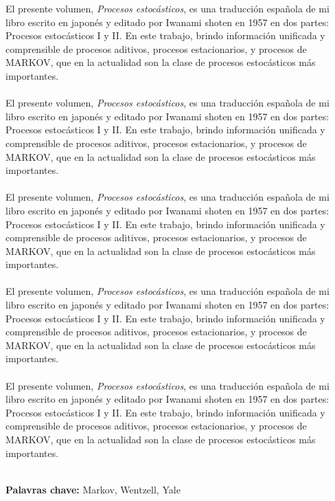 \noindent El presente volumen, \textit{Procesos estocásticos}, es una traducción española de mi libro escrito en japonés y editado por Iwanami shoten en 1957 en dos partes: Procesos estocásticos I y II. En este trabajo, brindo información unificada y comprensible de procesos aditivos, procesos estacionarios, y procesos de MARKOV, que en la actualidad son la clase de procesos estocásticos más importantes.\\\\ 
\noindent El presente volumen, \textit{Procesos estocásticos}, es una traducción española de mi libro escrito en japonés y editado por Iwanami shoten en 1957 en dos partes: Procesos estocásticos I y II. En este trabajo, brindo información unificada y comprensible de procesos aditivos, procesos estacionarios, y procesos de MARKOV, que en la actualidad son la clase de procesos estocásticos más importantes.\\\\ 
\noindent El presente volumen, \textit{Procesos estocásticos}, es una traducción española de mi libro escrito en japonés y editado por Iwanami shoten en 1957 en dos partes: Procesos estocásticos I y II. En este trabajo, brindo información unificada y comprensible de procesos aditivos, procesos estacionarios, y procesos de MARKOV, que en la actualidad son la clase de procesos estocásticos más importantes.\\\\ 
\noindent El presente volumen, \textit{Procesos estocásticos}, es una traducción española de mi libro escrito en japonés y editado por Iwanami shoten en 1957 en dos partes: Procesos estocásticos I y II. En este trabajo, brindo información unificada y comprensible de procesos aditivos, procesos estacionarios, y procesos de MARKOV, que en la actualidad son la clase de procesos estocásticos más importantes.\\\\ 
\noindent El presente volumen, \textit{Procesos estocásticos}, es una traducción española de mi libro escrito en japonés y editado por Iwanami shoten en 1957 en dos partes: Procesos estocásticos I y II. En este trabajo, brindo información unificada y comprensible de procesos aditivos, procesos estacionarios, y procesos de MARKOV, que en la actualidad son la clase de procesos estocásticos más importantes.\\\\ 
\par
\vspace{1em}
\noindent\textbf{Palavras chave:} Markov, Wentzell, Yale
